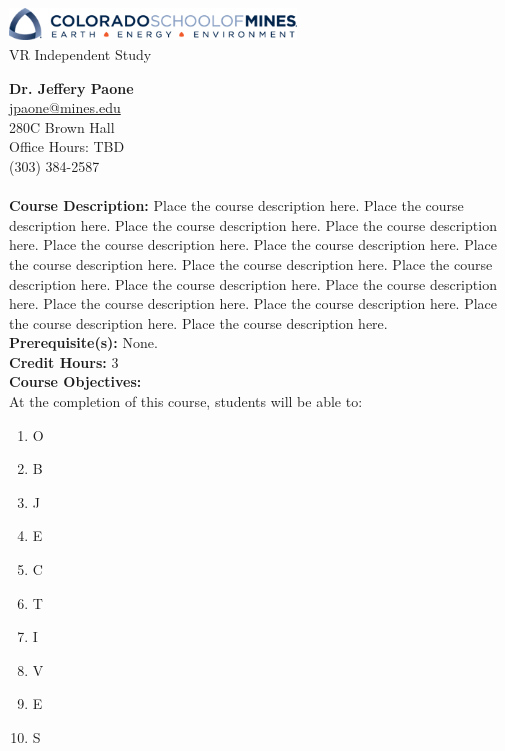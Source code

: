 \documentclass[11pt]{article}
\begin{document}
\begin{center}
    \includegraphics[width=3in]{logo-mines.png}
    \vspace{10mm}\\
    \LARGE VR Independent Study
    \vspace{10mm}
\end{center}

\textbf{Dr. Jeffery Paone} \\
\url{jpaone@mines.edu} \\
280C Brown Hall \\
Office Hours: TBD \\
(303) 384-2587 \\

\textbf {\large \\ Course Description:}
Place the course description here. Place the course description here. Place the
course description here. Place the course description here. Place the course
description here. Place the course description here. Place the course
description here. Place the course description here. Place the course
description here. Place the course description here. Place the course
description here. Place the course description here. Place the course
description here. Place the course description here. Place the course
description here. \\

\textbf {Prerequisite(s):} None.\\
\textbf {Credit Hours:} 3 \\

\textbf {\large Course Objectives:} \\
At the completion of this course, students will be able to:
\begin{enumerate} \itemsep-0.4em
    \item O
    \item B
    \item J  \item E
    \item C  \item T  \item I
    \item V
    \item E
    \item S
\end{enumerate}
\end{document}

